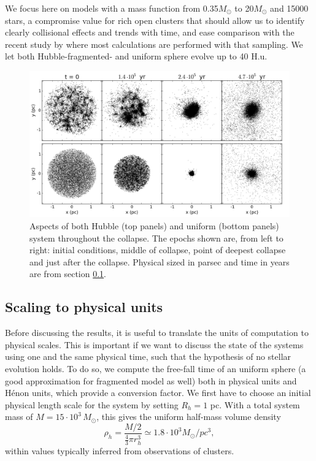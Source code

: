  We focus here on models with a mass function from 0.35$M_\odot$ to 20$M_\odot$ and 15000 stars, a compromise value for rich open clusters that should allow us to identify clearly collisional effects and trends with time, and ease comparison with the recent study by \cite{Caputo2014} where most calculations are performed with that sampling. We let both Hubble-fragmented- and uniform sphere evolve up to 40 H.u. 





\begin{figure}
\begin{center}
\includegraphics[width=\textwidth]{Figures/3_collapse}
\caption[Stages of collapse for HL fragmented and uniform models]{Aspects of both Hubble (top panels) and uniform (bottom panels) system throughout the collapse. The epochs shown are, from left to right: initial conditions, middle of collapse, point of deepest collapse and just after the collapse. Physical sized in parsec and time in years are from section \ref{Sec:3_Scaling}.}
\label{Fig:3_collapse}
\end{center}
\end{figure}


\subsection{Scaling to physical units}
\label{Sec:3_Scaling}
Before discussing the results, it is useful to translate the units of computation to physical scales. This is important if we want to discuss the state of the systems using one and the same physical time, such that the hypothesis of no stellar evolution holds.
To do so, we compute the free-fall time of an uniform sphere (a good approximation for fragmented model as well) both in physical units and H\'enon units, which provide a conversion factor. We first have to choose an initial physical length scale for the system by setting $R_h = 1$ pc. With a total system mass of $M = 15\cdot 10^3\, M_\odot$, this gives the uniform half-mass volume density 
\begin{equation}
\rho_h = \frac{M/2}{\frac{4}{3}\pi r_h^3}  \simeq 1.8 \cdot10^3 M_\odot / pc^3,
\end{equation}
within values typically inferred from observations of clusters.

